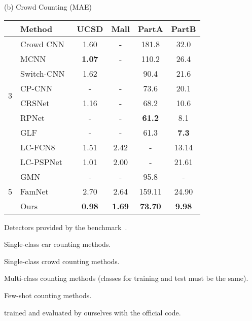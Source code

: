 \documentclass[10pt,twocolumn,letterpaper]{article}
\begin{document}
\begin{table}[t]
\begin{minipage}[t]{0.5\textwidth}
\centering
\scriptsize
\setlength\tabcolsep{8pt}
(b) Crowd Counting (MAE) \\
\begin{threeparttable}
\begin{tabular}{clcccc}
\toprule
 & Method & UCSD & Mall & PartA & PartB \\
\midrule
\multirow{8}{*}{3}
& Crowd CNN~\cite{crowd_cnn}   & 1.60    & -        & 181.8     & 32.0     \\
& MCNN~\cite{mcnn}             & \textbf{1.07} & -  & 110.2     & 26.4     \\
& Switch-CNN~\cite{switch_cnn} & 1.62    &          & 90.4      & 21.6     \\
& CP-CNN~\cite{cp_cnn}         & -       & -        & 73.6      & 20.1     \\
& CRSNet~\cite{crsnet}         & 1.16    & -        & 68.2      & 10.6     \\
& RPNet~\cite{rpnet}           & -       & -        & \textbf{61.2} & 8.1      \\
& GLF~\cite{glf}               & -       & -        & 61.3          & \textbf{7.3}      \\
\cmidrule{1-6}
\multirow{2}{*}{4}
& LC-FCN8~\cite{blobs}         & 1.51      & 2.42      & -           & 13.14    \\
& LC-PSPNet~\cite{blobs}       & 1.01      & 2.00      & -           & 21.61    \\
\cmidrule{1-6}
\multirow{3}{*}{5}
& GMN~\cite{gmn}               & -         & -         & 95.8        & -        \\
& FamNet~\cite{famnet}         & 2.70\tnote{\dag} & 2.64\tnote{\dag} & 159.11\tnote{\dag} & 24.90\tnote{\dag} \\
\cmidrule{2-6}
& Ours & \textbf{0.98} & \textbf{1.69} & \textbf{73.70} & \textbf{9.98}     \\
\bottomrule
\end{tabular}
\end{threeparttable}
\end{minipage}
\begin{threeparttable}
\begin{tablenotes}
\scriptsize
\item[1] Detectors provided by the benchmark~\cite{lpn}.
\item[2] Single-class car counting methods. 
\item[3] Single-class crowd counting methods. 
\item[4] Multi-class counting methods (classes for training and test must be the same). 
\item[5] Few-shot counting methods. 
\item[$\dag$] trained and evaluated by ourselves with the official code.
\end{tablenotes}
\end{threeparttable}
\label{appendix:tab:res_car_crowd}
\end{table}
\end{document}
